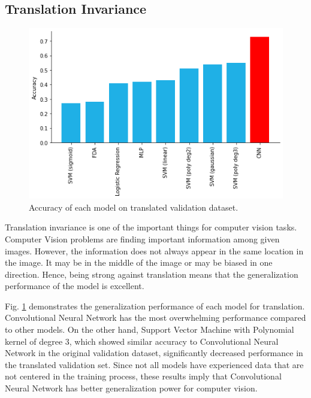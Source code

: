 \documentclass[main.tex]{subfiles}
\begin{document}
\subsection{Translation Invariance}
\begin{figure}[H]
	\centering
	\includegraphics[scale=0.5]{img/result/translate_acc.png}
		
	\caption{Accuracy of each model on translated validation dataset.}
	\label{translatefig}
\end{figure}

Translation invariance is one of the important things for computer vision tasks.
Computer Vision problems are finding important information among given images.
However, the information does not always appear in the same location in the image.
It may be in the middle of the image or may be biased in one direction.
Hence, being strong against translation means that the generalization performance of the model is excellent.

Fig. \ref*{translatefig} demonstrates the generalization performance of each model for translation.
Convolutional Neural Network has the most overwhelming performance compared to other models.
On the other hand, Support Vector Machine with Polynomial kernel of degree 3, which showed similar accuracy to Convolutional Neural Network in the original validation dataset,
significantly decreased performance in the translated validation set.
Since not all models have experienced data that are not centered in the training process,
these results imply that Convolutional Neural Network has better generalization power for computer vision.
\end{document}

